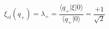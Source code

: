 \begin{equation}
\label{xiplus}
\xi_{cl}(q_+)=\lambda_+=\frac{\langle q_+|\xi|0 \rangle}{\langle q_+|0 
\rangle}
=\frac{+1}{\sqrt{2}}
\end{equation}

